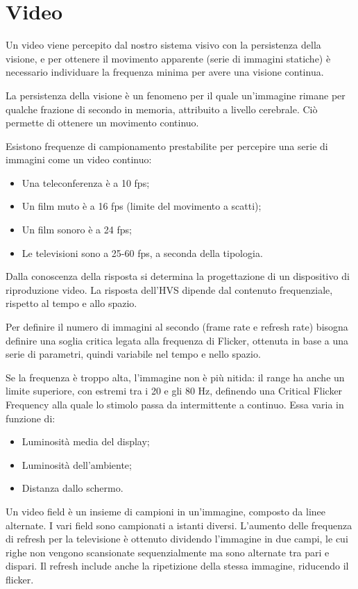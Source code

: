 \section{Video}
Un video viene percepito dal nostro sistema visivo con la persistenza della visione, e per ottenere il movimento apparente (serie di immagini statiche) è necessario individuare la frequenza minima per avere una visione continua. 

La persistenza della visione è un fenomeno per il quale un'immagine rimane per qualche frazione di secondo in memoria, attribuito a livello cerebrale. Ciò permette di ottenere un movimento continuo. 

Esistono frequenze di campionamento prestabilite per percepire una serie di immagini come un video continuo:
\begin{itemize}
	\item Una teleconferenza è a 10 fps;
	\item Un film muto è a 16 fps (limite del movimento a scatti);
	\item Un film sonoro è a 24 fps;
	\item Le televisioni sono a 25-60 fps, a seconda della tipologia.
\end{itemize}

Dalla conoscenza della risposta si determina la progettazione di un dispositivo di riproduzione video. La risposta dell'HVS dipende dal contenuto frequenziale, rispetto al tempo e allo spazio.

Per definire il numero di immagini al secondo (frame rate e refresh rate) bisogna definire una soglia critica legata alla frequenza di Flicker, ottenuta in base a una serie di parametri, quindi variabile nel tempo e nello spazio.

Se la frequenza è troppo alta, l'immagine non è più nitida: il range ha anche un limite superiore, con estremi tra i 20 e gli 80 Hz, definendo una Critical Flicker Frequency alla quale lo stimolo passa da intermittente a continuo. Essa varia in funzione di:
\begin{itemize}
	\item Luminosità media del display;
	\item Luminosità dell'ambiente;
	\item Distanza dallo schermo.
\end{itemize}

Un video field è un insieme di campioni in un'immagine, composto da linee alternate. I vari field sono campionati a istanti diversi. L'aumento delle frequenza di refresh per la televisione è ottenuto dividendo l'immagine in due campi, le cui righe non vengono scansionate sequenzialmente ma sono alternate tra pari e dispari. Il refresh include anche la ripetizione della stessa immagine, riducendo il flicker.

